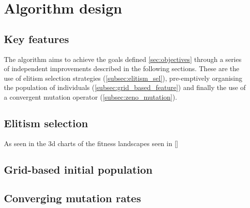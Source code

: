 \documentclass[authoryearcitations]{UoYCSproject}
\begin{document}
\section{Algorithm design}
\subsection{Key features}
The algorithm aims to achieve the goals defined \autoref{sec:objectives} through a series of independent improvements described in the following sections. These are the use of elitism selection strategies (\autoref{subsec:elitism_sel}), pre-emptively organising the population of individuals (\autoref{subsec:grid_based_feature}) and finally the use of a convergent mutation operator (\autoref{subsec:zeno_mutation}).

\subsection{Elitism selection}
\label{subsec:elitism_sel}
As seen in the 3d charts of the fitness landscapes seen in \autoref{}

\subsection{Grid-based initial population}
\label{subsec:grid_based_feature}

\subsection{Converging mutation rates}
\label{subsec:zeno_mutation}



\end{document}
